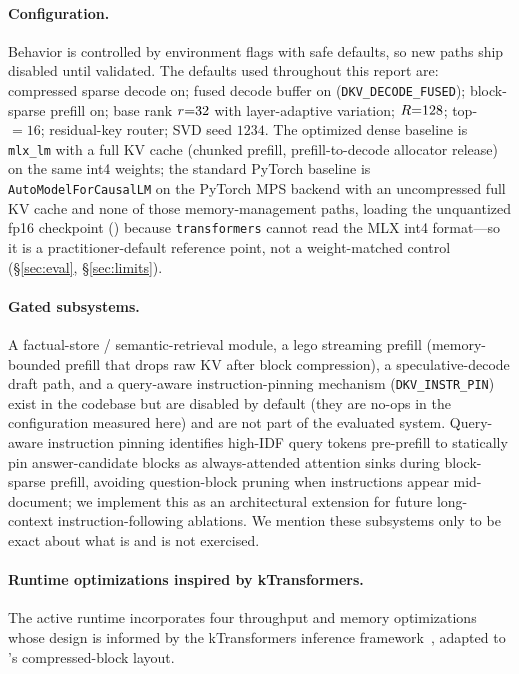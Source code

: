 \paragraph{Configuration.} Behavior is controlled by environment flags with safe defaults, so new
paths ship disabled until validated. The defaults used throughout this report are: compressed
sparse decode on; fused decode buffer on (\texttt{DKV\_DECODE\_FUSED}); block-sparse prefill
on; base rank $r{=}32$ with layer-adaptive variation; $R{=}128$; top-\topk{} $=16$;
residual-key router; SVD seed $1234$. The optimized dense baseline is \texttt{mlx\_lm} with a full
KV cache (chunked prefill, prefill-to-decode allocator release) on the same int4 weights; the
standard PyTorch baseline is \texttt{AutoModelForCausalLM} on the PyTorch MPS backend with an
uncompressed full KV cache and none of those memory-management paths, loading the unquantized fp16
checkpoint () because \texttt{transformers} cannot read the MLX
int4 format---so it is a practitioner-default reference point, not a weight-matched control
(\S\ref{sec:eval}, \S\ref{sec:limits}).

\paragraph{Gated subsystems.} A factual-store / semantic-retrieval module, a lego streaming
prefill (memory-bounded prefill that drops raw KV after block compression), a speculative-decode
draft path, and a query-aware instruction-pinning mechanism (\texttt{DKV\_INSTR\_PIN}) exist in the
codebase but are disabled by default (they are no-ops in the configuration measured here) and are
not part of the evaluated system. Query-aware instruction pinning identifies high-IDF query tokens
pre-prefill to statically pin answer-candidate blocks as always-attended attention sinks during
block-sparse prefill, avoiding question-block pruning when instructions appear mid-document; we
implement this as an architectural extension for future long-context instruction-following ablations.
We mention these subsystems only to be exact about what is and is not exercised.


\paragraph{Runtime optimizations inspired by kTransformers.}
\label{par:ktransformers}
The active runtime incorporates four throughput and memory optimizations whose design is informed
by the kTransformers inference framework~\cite{yang2025ktransformers}, adapted to \dkv{}'s
compressed-block layout.

